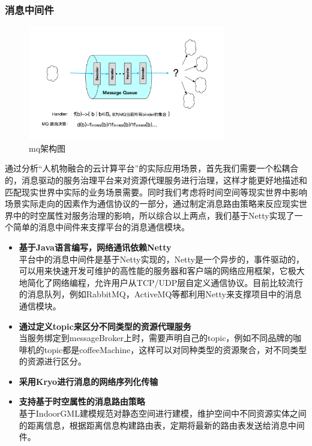 \documentclass[a4paper]{article}
\theoremstyle{definition}
\begin{document}
\subsubsection{消息中间件}
\begin{figure}[ht]
 \centering
 \includegraphics[height=5cm]{images/mq_architecture.jpg}
 \caption{mq架构图}
 \label{fig:singleblock}
\end{figure}
通过分析“人机物融合的云计算平台”的实际应用场景，首先我们需要一个松耦合的，消息驱动的服务治理平台来对资源代理服务进行治理，这样才能更好地描述和匹配现实世界中实际的业务场景需要。同时我们考虑将时间空间等现实世界中影响场景实际走向的因素作为通信协议的一部分，通过制定消息路由策略来反应现实世界中的时空属性对服务治理的影响，所以综合以上两点，我们基于Netty实现了一个简单的消息中间件来支撑平台的消息通信模块。

\begin{itemize}
    \item {\textbf{基于Java语言编写，网络通讯依赖Netty}}\\
    平台中的消息中间件是基于Netty实现的，Netty是一个异步的，事件驱动的，可以用来快速开发可维护的高性能的服务器和客户端的网络应用框架，它极大地简化了网络编程，允许用户从TCP/UDP层自定义通信协议。目前比较流行的消息队列，例如RabbitMQ，ActiveMQ等都利用Netty来支撑项目中的消息通信模块。
    \item {\textbf{通过定义topic来区分不同类型的资源代理服务}}\\
    当服务绑定到messageBroker上时，需要声明自己的topic，例如不同品牌的咖啡机的topic都是coffeeMachine，这样可以对同种类型的资源聚合，对不同类型的资源进行区分。
    \item {\textbf{采用Kryo进行消息的网络序列化传输}}
    \item{\textbf{支持基于时空属性的消息路由策略}}\\
    基于IndoorGML建模规范对静态空间进行建模，维护空间中不同资源实体之间的距离信息，根据距离信息构建路由表，定期将最新的路由表发送给消息中间件。
\end{itemize}
\newpage
\end{document}
